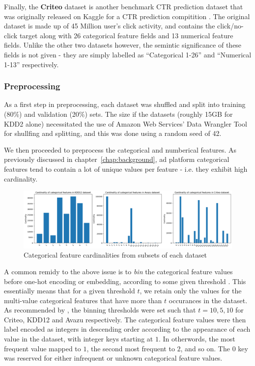 \documentclass{mldsmsc}
\begin{document}
Finally, the \textbf{Criteo} dataset is another benchmark CTR prediction dataset 
that was originally released on Kaggle for a CTR prediction compitition \citep{RefWorks:tien2014display}. 
The original dataset is made up of 45 Million user's click activity, and 
contains the click/no-click target along with 26 categorical feature 
fields and 13 numerical feature fields. Unlike the other two datasets 
however, the semintic significance of these fields is not given - they 
are simply labelled as ``Categorical 1-26'' and ``Numerical 1-13'' 
respectively.

\subsubsection{Preprocessing}

As a first step in preprocessing, each dataset was shuffled and split into training (80\%) and validation (20\%)
sets. The size if the datasets (roughly 15GB for KDD2 alone) necessitated the use of Amazon Web Services'
Data Wrangler Tool for shullfing and splitting, and this was done using a random seed of 42.

We then proceeded to preprocess the categorical and numberical features. As previously
discussed in chapter~\ref{chap:background}, ad platform categorical features tend to contain
a lot of unique values per feature - i.e. they exhibit high cardinality.

\begin{figure}[h]
    \centering
    \includegraphics[width=\textwidth]{../figures/dataset_cardinalities.png}
    \caption{Categorical feature cardinalities from subsets of each dataset}
    \label{fig:cardinalities}
\end{figure}

A common remidy to the above issue is to \emph{bin} the categorical feature 
values before one-hot encoding or embedding, according to some given 
threshold \citep{RefWorks:song2019autoint}. This essentially means that for a 
given threshold $t$, we retain only the values for the multi-value 
categorical features that have more than $t$ occurances in the dataset. As recommended by
\cite{RefWorks:song2019autoint}, the binning thresholds were set such that
$t = {10,5,10}$ for Criteo, KDD12 and Avazu respectively. The categorical
feature values were then label encoded as integers in descending order according
to the appearance of each value in the dataset, with integer keys starting
at $1$. In otherwords, the most frequent value mapped to $1$, the second most frequent
to $2$, and so on. The $0$ key was reserved for either infrequent or unknown categorical
feature values.
\end{document}
